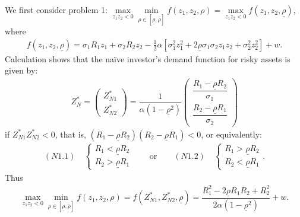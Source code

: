 \documentclass[10pt]{article}
\begin{document}
We first consider problem 1: $ \max\limits_{z_1 z_2 < 0} \min\limits_{\rho \in [\underline{\rho}, \overline{\rho}]} f (z_1, z_2, \rho) = \max\limits_{z_1 z_2 < 0} f (z_1, z_2, \underline{\rho}) $, where
\begin{eqnarray*}
f (z_1, z_2, \underline{\rho}) = \sigma_1 R_1 z_1 + \sigma_2 R_2 z_2 - \frac12 \alpha [\sigma_1^2 z_1^2 + 2 \underline{\rho} \sigma_1 \sigma_2 z_1 z_2 + \sigma_2^2 z_2^2] + w.
\end{eqnarray*}
Calculation shows that the na\"ive investor's demand function for risky assets is given by:
\begin{eqnarray}
Z_N^* = \left( \begin{matrix} Z_{N 1}^* \\ Z_{N 2}^* \end{matrix} \right) = \dfrac1{\alpha (1 - \underline{\rho}^2)} \left( \begin{matrix} \dfrac{R_1 - \underline{\rho} R_2}{\sigma_1} \\ \dfrac{R_2 - \underline{\rho} R_1}{\sigma_2} \end{matrix} \right)
\end{eqnarray}
if $ Z_{N 1}^* Z_{N 2}^* < 0 $, that is, $ (R_1 - \underline{\rho} R_2) (R_2 - \underline{\rho} R_1) < 0 $, or equivalently:
\begin{eqnarray}
(N1.1) \quad \left\{ \begin{matrix} R_1 < \underline{\rho} R_2 \\ R_2 > \underline{\rho} R_1 \end{matrix} \right. \qquad \text{or} \qquad (N1.2) \quad \left\{ \begin{matrix} R_1 > \underline{\rho} R_2 \\ R_2 < \underline{\rho} R_1 \end{matrix} \right..
\end{eqnarray}
Thus
\begin{eqnarray*}
\max\limits_{z_1 z_2 < 0} \min\limits_{\rho \in [\underline{\rho}, \overline{\rho}]} f (z_1, z_2, \rho) = f (Z_{N 1}^*, Z_{N 2}^*, \underline{\rho}) = \dfrac{R_1^2 - 2 \underline{\rho} R_1 R_2 + R_2^2}{2 \alpha (1 - \underline{\rho}^2)} + w.
\end{eqnarray*}
\end{document}
